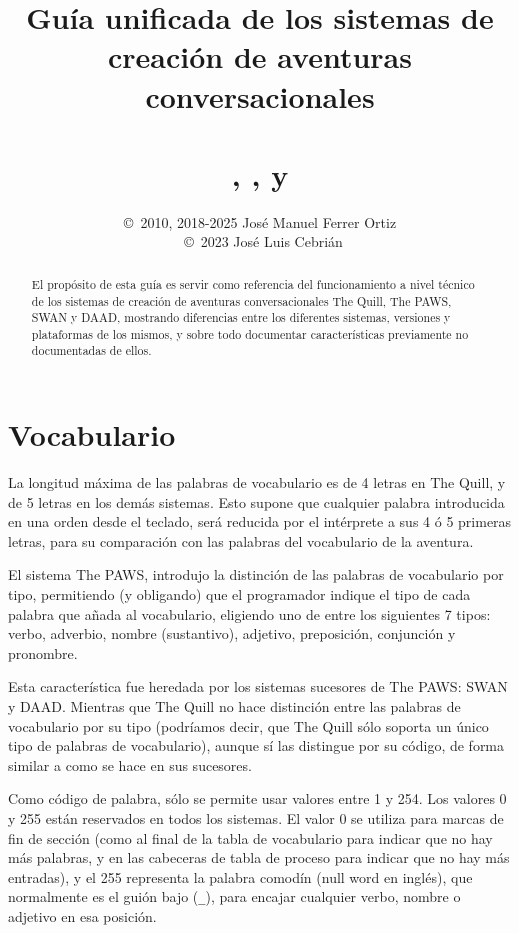 \documentclass[11pt, a5paper]{article}
\title{Guía unificada de los sistemas de creación de aventuras conversacionales
       \\\ \\\Huge{\quill, \paw, \swan y \daad}}
\author{\copyright\ 2010, 2018-2025 José Manuel Ferrer Ortiz
       \\\ \copyright\ 2023 José Luis Cebrián}
\newcommand{\quill}{\textsf{The Quill}\xspace}
\newcommand{\paw}{\textsf{The PAWS}\xspace}
\newcommand{\swan}{\textsf{SWAN}\xspace}
\newcommand{\daad}{\textsf{DAAD}\xspace}
\begin{document}
\maketitle
\tableofcontents
\newpage

\begin{abstract}
El propósito de esta guía es servir como referencia del funcionamiento a nivel técnico de los sistemas de creación de aventuras conversacionales \quill, \paw, \swan y \daad, mostrando diferencias entre los diferentes sistemas, versiones y plataformas de los mismos, y sobre todo documentar características previamente no documentadas de ellos.
\end{abstract}

\section{Vocabulario}\label{vocab}

La longitud máxima de las palabras de vocabulario es de 4 letras en \quill, y de 5 letras en los demás sistemas. Esto supone que cualquier palabra introducida en una orden desde el teclado, será reducida por el intérprete a sus 4 ó 5 primeras letras, para su comparación con las palabras del vocabulario de la aventura.

El sistema \paw, introdujo la distinción de las palabras de vocabulario por tipo, permitiendo (y obligando) que el programador indique el tipo de cada palabra que añada al vocabulario, eligiendo uno de entre los siguientes 7 tipos: verbo, adverbio, nombre (sustantivo), adjetivo, preposición, conjunción y pronombre.

Esta característica fue heredada por los sistemas sucesores de \paw: \swan y \daad. Mientras que \quill no hace distinción entre las palabras de vocabulario por su tipo (podríamos decir, que \quill sólo soporta un único tipo de palabras de vocabulario), aunque sí las distingue por su código, de forma similar a como se hace en sus sucesores.

Como código de palabra, sólo se permite usar valores entre 1 y 254. Los valores 0 y 255 están reservados en todos los sistemas. El valor 0 se utiliza para marcas de fin de sección (como al final de la tabla de vocabulario para indicar que no hay más palabras, y en las cabeceras de tabla de proceso para indicar que no hay más entradas), y el 255 representa la palabra comodín (null word en inglés), que normalmente es el guión bajo (\texttt{\_}), para encajar cualquier verbo, nombre o adjetivo en esa posición.
\end{document}
